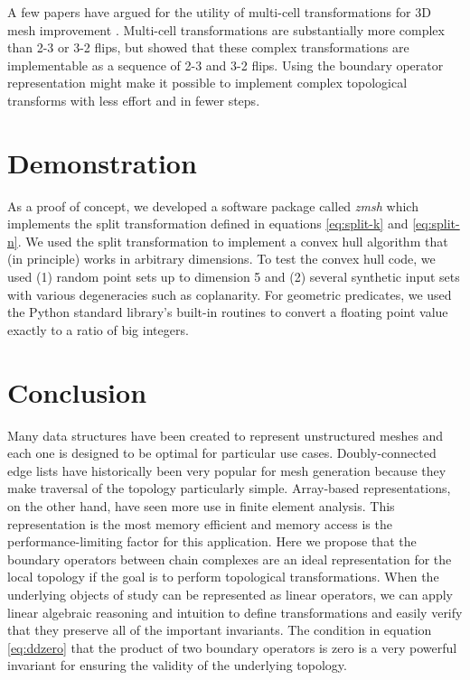 \documentclass[twocolumn]{article}
\begin{document}
A few papers have argued for the utility of multi-cell transformations for 3D mesh improvement \cite{klingner2008aggressive}.
Multi-cell transformations are substantially more complex than 2-3 or 3-2 flips, but \cite{misztal2009tetrahedral} showed that these complex transformations are implementable as a sequence of 2-3 and 3-2 flips.
Using the boundary operator representation might make it possible to implement complex topological transforms with less effort and in fewer steps.


\section{Demonstration}

As a proof of concept, we developed a software package called \emph{zmsh}
which implements the split transformation defined in equations \eqref{eq:split-k} and \eqref{eq:split-n}.
We used the split transformation to implement a convex hull algorithm that (in principle) works in arbitrary dimensions.
To test the convex hull code, we used (1) random point sets up to dimension 5 and (2) several synthetic input sets with various degeneracies such as coplanarity.
For geometric predicates, we used the Python standard library's built-in routines to convert a floating point value exactly to a ratio of big integers.


\section{Conclusion}

Many data structures have been created to represent unstructured meshes and each one is designed to be optimal for particular use cases.
Doubly-connected edge lists have historically been very popular for mesh generation because they make traversal of the topology particularly simple.
Array-based representations, on the other hand, have seen more use in finite element analysis.
This representation is the most memory efficient and memory access is the performance-limiting factor for this application.
Here we propose that the boundary operators between chain complexes are an ideal representation for the local topology if the goal is to perform topological transformations.
When the underlying objects of study can be represented as linear operators, we can apply linear algebraic reasoning and intuition to define transformations and easily verify that they preserve all of the important invariants.
The condition in equation \eqref{eq:ddzero} that the product of two boundary operators is zero is a very powerful invariant for ensuring the validity of the underlying topology.



\end{document}
